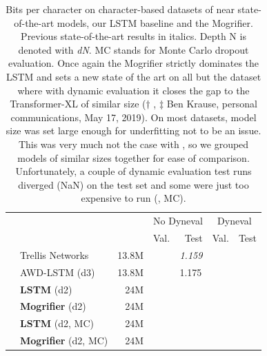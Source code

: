
\begin{table}[t!]
  \caption[Bits per character on character-based datasets of near
    state-of-the-art models.]{Bits per character on
    character-based datasets of near state-of-the-art models, our
    LSTM baseline and the Mogrifier. Previous
    state-of-the-art results in italics. Depth N is denoted with
    \emph{dN}. MC stands for Monte Carlo dropout evaluation. Once
    again the Mogrifier strictly dominates the LSTM and sets a new
    state of the art on all but the \enwik dataset where with dynamic
    evaluation it closes the gap to the Transformer-XL of similar size
    ($\dag$ \cite{krause2019dynamic}, $\ddag$ Ben Krause, personal
    communications, May 17, 2019). On most datasets, model size was
    set large enough for underfitting not to be an issue. This was
    very much not the case with \enwik, so we grouped models of
    similar sizes together for ease of comparison. Unfortunately, a
    couple of dynamic evaluation test runs diverged (NaN) on the test
    set and some were just too expensive to run (\enwik, MC).}
  \label{tab:mog-character-results}
  \centering
  \small
  \begin{tabular}{@{}llrllll@{}}
    & & & \multicolumn{2}{c}{No Dyneval} & \multicolumn{2}{c}{Dyneval} \\
    \cmidrule(lr){4-5} \cmidrule(lr){6-7}
    & & & Val. & \multicolumn{1}{r}{Test} & Val. & \multicolumn{1}{r}{Test} \\
    \midrule
    \parbox[t]{2mm}{}
    & Trellis Networks \citep{bai2018trellis} & 13.8M & & \emph{1.159} & & \\
    & AWD-LSTM (d3) \citep{merity2017regularizing} & 13.8M & & 1.175 & & \\
    & \textbf{LSTM} (d2) & 24M
        &  & 
        &  &  \\
    & \textbf{Mogrifier} (d2) & 24M
        &  & 
        &  &  \\
    & \textbf{LSTM} (d2, MC) & 24M
        &  & 
        &  &  \\
    & \textbf{Mogrifier} (d2, MC) & 24M
        &  & 

\end{tabular}
\end{table}
